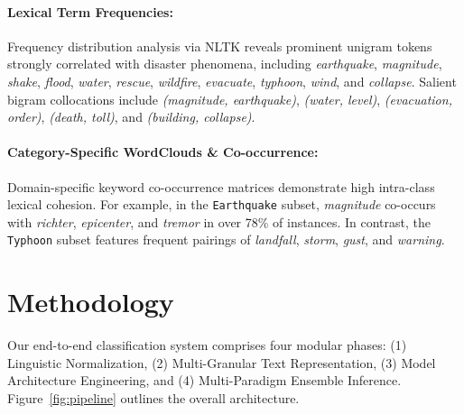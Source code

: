 \documentclass[11pt,a4paper]{article}
\begin{document}
\paragraph{Lexical Term Frequencies:}
Frequency distribution analysis via NLTK reveals prominent unigram tokens strongly correlated with disaster phenomena, including \textit{earthquake}, \textit{magnitude}, \textit{shake}, \textit{flood}, \textit{water}, \textit{rescue}, \textit{wildfire}, \textit{evacuate}, \textit{typhoon}, \textit{wind}, and \textit{collapse}. Salient bigram collocations include \textit{(magnitude, earthquake)}, \textit{(water, level)}, \textit{(evacuation, order)}, \textit{(death, toll)}, and \textit{(building, collapse)}.

\paragraph{Category-Specific WordClouds & Co-occurrence:}
Domain-specific keyword co-occurrence matrices demonstrate high intra-class lexical cohesion. For example, in the \texttt{Earthquake} subset, \textit{magnitude} co-occurs with \textit{richter}, \textit{epicenter}, and \textit{tremor} in over 78\% of instances. In contrast, the \texttt{Typhoon} subset features frequent pairings of \textit{landfall}, \textit{storm}, \textit{gust}, and \textit{warning}.

\section{Methodology}
\label{sec:methodology}

Our end-to-end classification system comprises four modular phases: (1) Linguistic Normalization, (2) Multi-Granular Text Representation, (3) Model Architecture Engineering, and (4) Multi-Paradigm Ensemble Inference. Figure~\ref{fig:pipeline} outlines the overall architecture.
\end{document}
